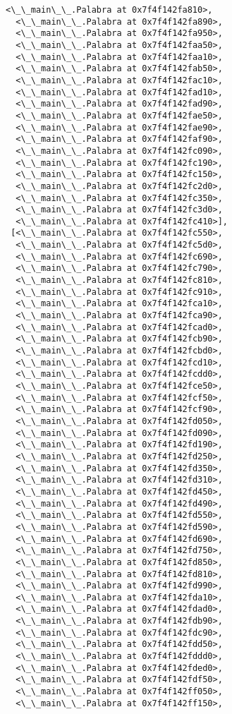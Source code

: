\documentclass[12pt,a4paper,table]{article}
\begin{document}
\begin{tcolorbox}[breakable, size=fbox, boxrule=.5pt, pad at break*=1mm, opacityfill=0]
\begin{Verbatim}[commandchars=\\\{\}]
  <\_\_main\_\_.Palabra at 0x7f4f142fa810>,
  <\_\_main\_\_.Palabra at 0x7f4f142fa890>,
  <\_\_main\_\_.Palabra at 0x7f4f142fa950>,
  <\_\_main\_\_.Palabra at 0x7f4f142faa50>,
  <\_\_main\_\_.Palabra at 0x7f4f142faa10>,
  <\_\_main\_\_.Palabra at 0x7f4f142fab50>,
  <\_\_main\_\_.Palabra at 0x7f4f142fac10>,
  <\_\_main\_\_.Palabra at 0x7f4f142fad10>,
  <\_\_main\_\_.Palabra at 0x7f4f142fad90>,
  <\_\_main\_\_.Palabra at 0x7f4f142fae50>,
  <\_\_main\_\_.Palabra at 0x7f4f142fae90>,
  <\_\_main\_\_.Palabra at 0x7f4f142faf90>,
  <\_\_main\_\_.Palabra at 0x7f4f142fc090>,
  <\_\_main\_\_.Palabra at 0x7f4f142fc190>,
  <\_\_main\_\_.Palabra at 0x7f4f142fc150>,
  <\_\_main\_\_.Palabra at 0x7f4f142fc2d0>,
  <\_\_main\_\_.Palabra at 0x7f4f142fc350>,
  <\_\_main\_\_.Palabra at 0x7f4f142fc3d0>,
  <\_\_main\_\_.Palabra at 0x7f4f142fc410>],
 [<\_\_main\_\_.Palabra at 0x7f4f142fc550>,
  <\_\_main\_\_.Palabra at 0x7f4f142fc5d0>,
  <\_\_main\_\_.Palabra at 0x7f4f142fc690>,
  <\_\_main\_\_.Palabra at 0x7f4f142fc790>,
  <\_\_main\_\_.Palabra at 0x7f4f142fc810>,
  <\_\_main\_\_.Palabra at 0x7f4f142fc910>,
  <\_\_main\_\_.Palabra at 0x7f4f142fca10>,
  <\_\_main\_\_.Palabra at 0x7f4f142fca90>,
  <\_\_main\_\_.Palabra at 0x7f4f142fcad0>,
  <\_\_main\_\_.Palabra at 0x7f4f142fcb90>,
  <\_\_main\_\_.Palabra at 0x7f4f142fcbd0>,
  <\_\_main\_\_.Palabra at 0x7f4f142fcd10>,
  <\_\_main\_\_.Palabra at 0x7f4f142fcdd0>,
  <\_\_main\_\_.Palabra at 0x7f4f142fce50>,
  <\_\_main\_\_.Palabra at 0x7f4f142fcf50>,
  <\_\_main\_\_.Palabra at 0x7f4f142fcf90>,
  <\_\_main\_\_.Palabra at 0x7f4f142fd050>,
  <\_\_main\_\_.Palabra at 0x7f4f142fd090>,
  <\_\_main\_\_.Palabra at 0x7f4f142fd190>,
  <\_\_main\_\_.Palabra at 0x7f4f142fd250>,
  <\_\_main\_\_.Palabra at 0x7f4f142fd350>,
  <\_\_main\_\_.Palabra at 0x7f4f142fd310>,
  <\_\_main\_\_.Palabra at 0x7f4f142fd450>,
  <\_\_main\_\_.Palabra at 0x7f4f142fd490>,
  <\_\_main\_\_.Palabra at 0x7f4f142fd550>,
  <\_\_main\_\_.Palabra at 0x7f4f142fd590>,
  <\_\_main\_\_.Palabra at 0x7f4f142fd690>,
  <\_\_main\_\_.Palabra at 0x7f4f142fd750>,
  <\_\_main\_\_.Palabra at 0x7f4f142fd850>,
  <\_\_main\_\_.Palabra at 0x7f4f142fd810>,
  <\_\_main\_\_.Palabra at 0x7f4f142fd990>,
  <\_\_main\_\_.Palabra at 0x7f4f142fda10>,
  <\_\_main\_\_.Palabra at 0x7f4f142fdad0>,
  <\_\_main\_\_.Palabra at 0x7f4f142fdb90>,
  <\_\_main\_\_.Palabra at 0x7f4f142fdc90>,
  <\_\_main\_\_.Palabra at 0x7f4f142fdd50>,
  <\_\_main\_\_.Palabra at 0x7f4f142fddd0>,
  <\_\_main\_\_.Palabra at 0x7f4f142fded0>,
  <\_\_main\_\_.Palabra at 0x7f4f142fdf50>,
  <\_\_main\_\_.Palabra at 0x7f4f142ff050>,
  <\_\_main\_\_.Palabra at 0x7f4f142ff150>,

\end{Verbatim}
\end{tcolorbox}
\end{document}
